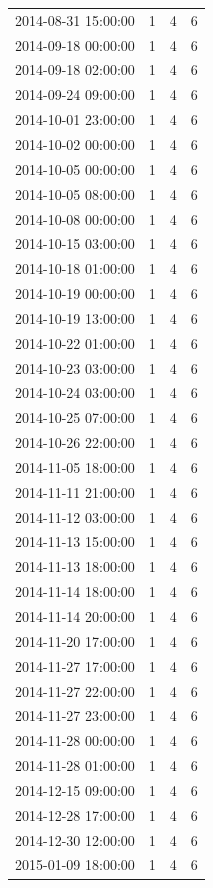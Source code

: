 \begin{tabular}{lrrr}
2014-08-31 15:00:00 & 1 & 4 & 6 \\
2014-09-18 00:00:00 & 1 & 4 & 6 \\
2014-09-18 02:00:00 & 1 & 4 & 6 \\
2014-09-24 09:00:00 & 1 & 4 & 6 \\
2014-10-01 23:00:00 & 1 & 4 & 6 \\
2014-10-02 00:00:00 & 1 & 4 & 6 \\
2014-10-05 00:00:00 & 1 & 4 & 6 \\
2014-10-05 08:00:00 & 1 & 4 & 6 \\
2014-10-08 00:00:00 & 1 & 4 & 6 \\
2014-10-15 03:00:00 & 1 & 4 & 6 \\
2014-10-18 01:00:00 & 1 & 4 & 6 \\
2014-10-19 00:00:00 & 1 & 4 & 6 \\
2014-10-19 13:00:00 & 1 & 4 & 6 \\
2014-10-22 01:00:00 & 1 & 4 & 6 \\
2014-10-23 03:00:00 & 1 & 4 & 6 \\
2014-10-24 03:00:00 & 1 & 4 & 6 \\
2014-10-25 07:00:00 & 1 & 4 & 6 \\
2014-10-26 22:00:00 & 1 & 4 & 6 \\
2014-11-05 18:00:00 & 1 & 4 & 6 \\
2014-11-11 21:00:00 & 1 & 4 & 6 \\
2014-11-12 03:00:00 & 1 & 4 & 6 \\
2014-11-13 15:00:00 & 1 & 4 & 6 \\
2014-11-13 18:00:00 & 1 & 4 & 6 \\
2014-11-14 18:00:00 & 1 & 4 & 6 \\
2014-11-14 20:00:00 & 1 & 4 & 6 \\
2014-11-20 17:00:00 & 1 & 4 & 6 \\
2014-11-27 17:00:00 & 1 & 4 & 6 \\
2014-11-27 22:00:00 & 1 & 4 & 6 \\
2014-11-27 23:00:00 & 1 & 4 & 6 \\
2014-11-28 00:00:00 & 1 & 4 & 6 \\
2014-11-28 01:00:00 & 1 & 4 & 6 \\
2014-12-15 09:00:00 & 1 & 4 & 6 \\
2014-12-28 17:00:00 & 1 & 4 & 6 \\
2014-12-30 12:00:00 & 1 & 4 & 6 \\
2015-01-09 18:00:00 & 1 & 4 & 6 \\

\end{tabular}
